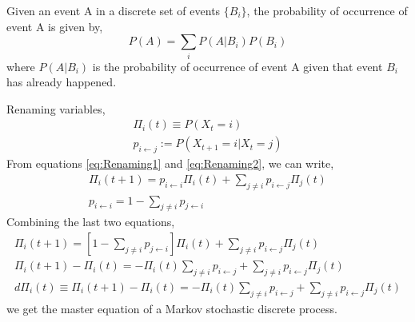 \begin{theorem}
Given an event A in a discrete set of events $\{B_{i}\}$, the probability of occurrence of event A is given by,
\begin{equation}
    P\left(A\right) = \sum_{i}P\left(A|B_{i}\right)P\left(B_{i}\right)
\end{equation}
where $P\left(A|B_{i}\right)$ is the probability of occurrence of event A given that event $B_{i}$ has already happened. 
\end{theorem}
Renaming variables,
\begin{align}
    \label{eq:Renaming1}
    \Pi_{i}(t) \equiv P\left(X_{t} = i\right) \\
    \label{eq:Renaming2}
    p_{i \leftarrow j} := P\left(X_{t+1} = i | X_{t}=j\right)
\end{align}
From equations \ref{eq:Renaming1} and \ref{eq:Renaming2}, we can write,
\begin{align}
        \Pi_{i}(t+1) = p_{i \leftarrow i}\Pi_{i}(t) + \sum_{j \neq i} p_{i \leftarrow j}\Pi_{j}(t) \\ 
        p_{i \leftarrow i} = 1 - \sum_{j\neq i}p_{j \leftarrow i}
\end{align}
Combining the last two equations,
\begin{align}
    \Pi_{i}(t+1) = \left[1 - \sum_{j\neq i}p_{j \leftarrow i}\right]\Pi_{i}(t) + \sum_{j\neq i}p_{i \leftarrow j}\Pi_{j}(t)\\
    \Pi_{i}(t+1) - \Pi_{i}(t) = -\Pi_{i}(t) \sum_{j \neq i}p_{i \leftarrow j} + \sum_{j \neq i} p_{i \leftarrow j}\Pi_{j}(t) \\
    \label{eq: MasterEquationDiscrete}
    d\Pi_{i}(t) \equiv \Pi_{i}(t+1) - \Pi_{i}(t) =  -\Pi_{i}(t) \sum_{j \neq i}p_{i \leftarrow j} + \sum_{j \neq i} p_{i \leftarrow j}\Pi_{j}(t)
\end{align}
we get the master equation of a Markov stochastic discrete process.
